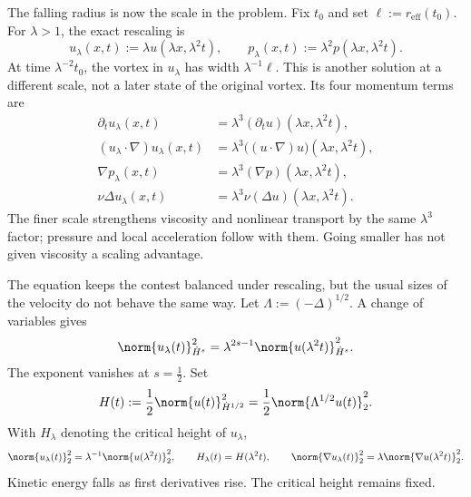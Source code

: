 
The falling radius is now the scale in the problem.
Fix \(t_0\) and set \(\ell:=r_{\mathrm{eff}}(t_0)\).
For \(\lambda>1\), the exact \NavierStokes{} rescaling is
\[
  u_\lambda(x,t)
  :=
  \lambda u(\lambda x,\lambda^2t),
  \qquad
  p_\lambda(x,t)
  :=
  \lambda^2p(\lambda x,\lambda^2t).
\]
At time \(\lambda^{-2}t_0\), the vortex in \(u_\lambda\) has width \(\lambda^{-1}\ell\).
This is another solution at a different scale, not a later state of the original vortex.
Its four momentum terms are
\[
\begin{aligned}
  \partial_tu_\lambda(x,t)
  &=
  \lambda^3(\partial_tu)(\lambda x,\lambda^2t),
  \\
  (u_\lambda\cdot\nabla)u_\lambda(x,t)
  &=
  \lambda^3\bigl((u\cdot\nabla)u\bigr)(\lambda x,\lambda^2t),
  \\
  \nabla p_\lambda(x,t)
  &=
  \lambda^3(\nabla p)(\lambda x,\lambda^2t),
  \\
  \nu\Delta u_\lambda(x,t)
  &=
  \lambda^3\nu(\Delta u)(\lambda x,\lambda^2t).
\end{aligned}
\]
The finer scale strengthens viscosity and nonlinear transport by the same \(\lambda^3\) factor; pressure and local acceleration follow with them.
Going smaller has not given viscosity a scaling advantage.


The equation keeps the contest balanced under rescaling, but the usual sizes of the velocity do not behave the same way.
Let \(\Lambda:=(-\Delta)^{1/2}\).
A change of variables gives
\[
  \norm{u_\lambda(t)}_{\dot H^s}^2
  =
  \lambda^{2s-1}
  \norm{u(\lambda^2t)}_{\dot H^s}^2.
\]
The exponent vanishes at \(s=\tfrac12\).
Set
\[
  H(t)
  :=
  \frac12\norm{u(t)}_{\dot H^{1/2}}^2
  =
  \frac12\norm{\Lambda^{1/2}u(t)}_2^2.
\]
With \(H_\lambda\) denoting the critical height of \(u_\lambda\),
\[
  \norm{u_\lambda(t)}_2^2
  =
  \lambda^{-1}\norm{u(\lambda^2t)}_2^2,
  \qquad
  H_\lambda(t)=H(\lambda^2t),
  \qquad
  \norm{\nabla u_\lambda(t)}_2^2
  =
  \lambda\norm{\nabla u(\lambda^2t)}_2^2.
\]
Kinetic energy falls as first derivatives rise.
The critical height remains fixed.


